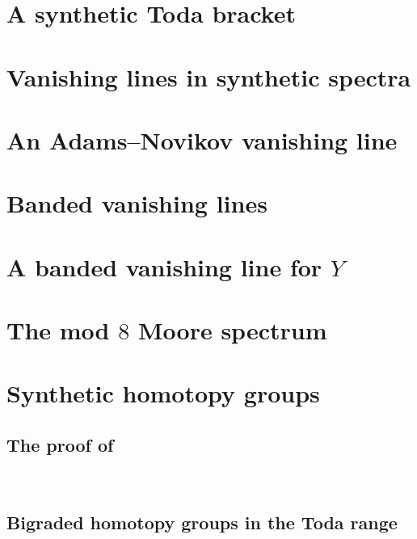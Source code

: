 \documentclass[reqno]{amsart}
\begin{document}
\section{A synthetic Toda bracket} \label{sec:SyntheticToda}


\section{Vanishing lines in synthetic spectra} \label{sec:AppendixVL}


\section{An Adams--Novikov vanishing line} \label{sec:ANvl}


\section{Banded vanishing lines} \label{sec:BandVan}


\section{A banded vanishing line for \texorpdfstring{$Y$}{Y}} \label{sec:Y}


\section{The mod \texorpdfstring{$8$}{8} Moore spectrum} \label{sec:mod8}


\appendix

\section{Synthetic homotopy groups} 
\label{sec:synthetic-appendix}



\subsection{The proof of }
\label{sec:proof-synth-Adams}\ 


  
\subsection{Bigraded homotopy groups in the Toda range}
\label{subsec:syn-toda-range}\ 
\end{document}
